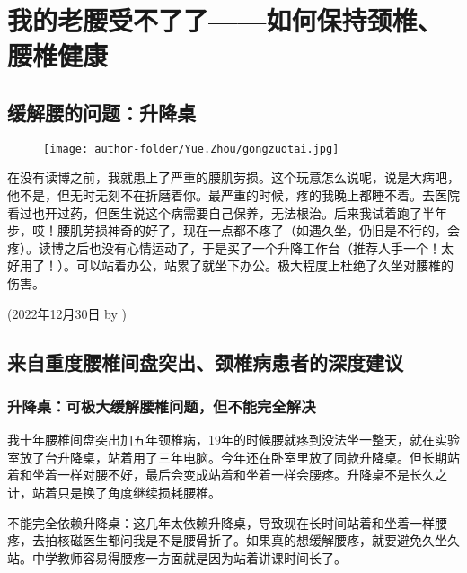 \section{我的老腰受不了了——如何保持颈椎、腰椎健康}

\subsection{缓解腰的问题：升降桌}

\begin{newminipage}[0.39]
    \begin{figure}[H]
        \texttt{[image: author-folder/Yue.Zhou/gongzuotai.jpg]}
    \end{figure}
\end{newminipage}
\begin{newminipage}[0.6]
    在没有读博之前，我就患上了严重的腰肌劳损。这个玩意怎么说呢，说是大病吧，他不是，但无时无刻不在折磨着你。最严重的时候，疼的我晚上都睡不着。去医院看过也开过药，但医生说这个病需要自己保养，无法根治。后来我试着跑了半年步，哎！腰肌劳损神奇的好了，现在一点都不疼了（如遇久坐，仍旧是不行的，会疼）。读博之后也没有心情运动了，于是买了一个升降工作台（推荐人手一个！太好用了！）。可以站着办公，站累了就坐下办公。极大程度上杜绝了久坐对腰椎的伤害。
\end{newminipage}

\begin{flushright}
(2022年12月30日 by \Yue)
\end{flushright}

\subsection{来自重度腰椎间盘突出、颈椎病患者的深度建议}

\subsubsection{升降桌：可极大缓解腰椎问题，但不能完全解决}

我十年腰椎间盘突出加五年颈椎病，19年的时候腰就疼到没法坐一整天，就在实验室放了台升降桌，站着用了三年电脑。今年还在卧室里放了同款升降桌。但长期站着和坐着一样对腰不好，最后会变成站着和坐着一样会腰疼。升降桌不是长久之计，站着只是换了角度继续损耗腰椎。

不能完全依赖升降桌：这几年太依赖升降桌，导致现在长时间站着和坐着一样腰疼，去拍核磁医生都问我是不是腰骨折了。如果真的想缓解腰疼，就要避免久坐久站。中学教师容易得腰疼一方面就是因为站着讲课时间长了。

